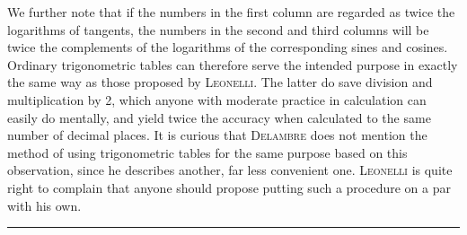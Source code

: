 \noindent We further note that if the numbers in the first column are regarded as twice the logarithms of tangents, the numbers in the second and third columns will be twice the complements of the logarithms of the corresponding sines and cosines. Ordinary trigonometric tables can therefore serve the intended purpose in exactly the same way as those proposed by \textsc{Leonelli}. The latter do save division and multiplication by 2, which anyone with moderate practice in calculation can easily do mentally, and yield twice the accuracy when calculated to the same number of decimal places. It is curious that \textsc{Delambre} does not mention the method of using trigonometric tables for the same purpose based on this observation, since he describes another, far less convenient one. \textsc{Leonelli} is quite right to complain that anyone should propose putting such a procedure on a par with his own.\par\medskip\begin{center}\rule{.24\linewidth}{.3pt}\end{center}


